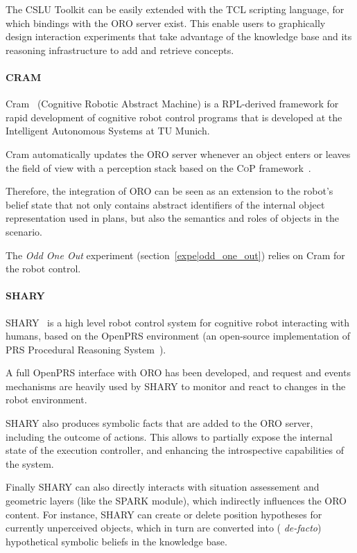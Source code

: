 The CSLU Toolkit can be easily extended with the TCL scripting language, for
which bindings with the ORO server exist. This enable users to graphically
design interaction experiments that take advantage of the knowledge base and
its reasoning infrastructure to add and retrieve concepts.

\paragraph{CRAM}
\label{sect|cram}

{\sc Cram}~\cite{Beetz2010} (Cognitive Robotic Abstract Machine) is a
RPL-derived framework for rapid development of cognitive robot control programs
that is developed at the Intelligent Autonomous Systems at TU Munich.

{\sc Cram} automatically updates the ORO server whenever an object enters or
leaves the field of view with a perception stack based on the \textsc{CoP}
framework~\cite{Klank2009}.

Therefore, the integration of ORO can be seen as an extension to
the robot's belief state that not only contains abstract identifiers
of the internal object representation used in plans, but also the
semantics and roles of objects in the scenario.

The \emph{Odd One Out} experiment (section~\ref{expe|odd_one_out}) relies on
{\sc Cram} for the robot control.

\paragraph{SHARY}

SHARY~\cite{Warnier2012} is a high level robot control system for cognitive
robot interacting with humans, based on the {\sc OpenPRS} environment (an
open-source implementation of PRS Procedural Reasoning
System~\cite{Ingrand1992}).

A full {\sc OpenPRS} interface with ORO has been developed, and request and
events mechanisms are heavily used by SHARY to monitor and react to changes in
the robot environment.

SHARY also produces symbolic facts that are added to the ORO server, including
the outcome of actions. This allows to partially expose the internal state of
the execution controller, and enhancing the introspective capabilities of the
system.

Finally SHARY can also directly interacts with situation assessement and
geometric layers (like the SPARK module), which indirectly influences the ORO
content. For instance, SHARY can create or delete position hypotheses for
currently unperceived objects, which in turn are converted into ({\it
de-facto}) hypothetical symbolic beliefs in the knowledge base.

